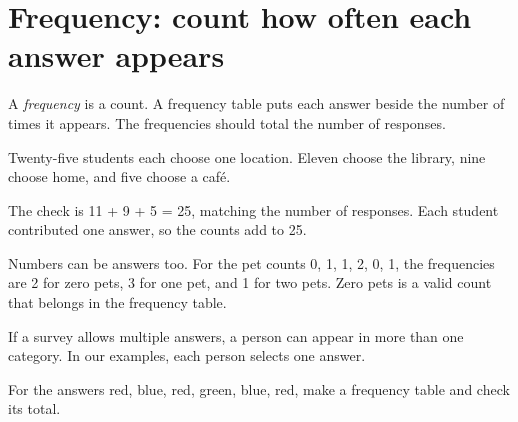 \documentclass[12pt,letterpaper]{article}
\begin{document}
\section{Frequency: count how often each answer appears}

A \emph{frequency} is a count. A frequency table puts each answer beside the number of times it appears. The frequencies should total the number of responses.


\begin{tcolorbox}[title={One preferred study location per person},breakable]

Twenty-five students each choose one location. Eleven choose the library, nine choose home, and five choose a café.


\end{tcolorbox}

\par{}\par\medskip

The check is 11 + 9 + 5 = 25, matching the number of responses. Each student contributed one answer, so the counts add to 25.


Numbers can be answers too. For the pet counts 0, 1, 1, 2, 0, 1, the frequencies are 2 for zero pets, 3 for one pet, and 1 for two pets. Zero pets is a valid count that belongs in the frequency table.


\begin{tcolorbox}[title={When someone can choose more than one answer},breakable,colback=warm,colbacktitle=warm,coltitle=gold,colframe=gold!35]

If a survey allows multiple answers, a person can appear in more than one category. In our examples, each person selects one answer.


\end{tcolorbox}

\begin{tcolorbox}[title={Pause and try 2},breakable]
For the answers red, blue, red, green, blue, red, make a frequency table and check its total.
\end{tcolorbox}
\end{document}
